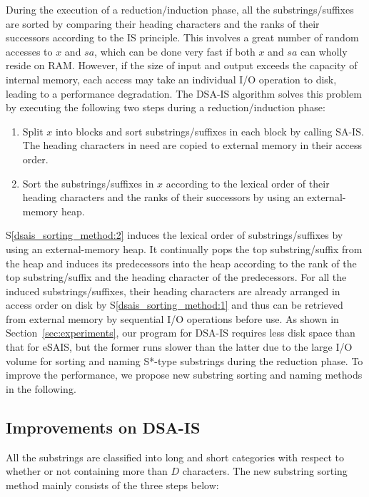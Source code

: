 \documentclass[10pt,journal,compsoc]{IEEEtran}
\begin{document}
During the execution of a reduction/induction phase, all the substrings/suffixes are sorted by comparing their heading characters and the ranks of their successors according to the IS principle. This involves a great number of random accesses to $x$ and $sa$, which can be done very fast if both $x$ and $sa$ can wholly reside on RAM. However, if the size of input and output exceeds the capacity of internal memory, each access may take an individual I/O operation to disk, leading to a performance degradation. The DSA-IS algorithm solves this problem by executing the following two steps during a reduction/induction phase:

\begin{enumerate}[S1]
	
	\item Split $x$ into blocks and sort substrings/suffixes in each block by calling SA-IS. The heading characters in need are copied to external memory in their access order. \label{dsais_sorting_method:1}
	
	\item Sort the substrings/suffixes in $x$ according to the lexical order of their heading characters and the ranks of their successors by using an external-memory heap. \label{dsais_sorting_method:2}
\end{enumerate}

S\ref{dsais_sorting_method:2} induces the lexical order of substrings/suffixes by using an external-memory heap. It continually pops the top substring/suffix from the heap and induces its predecessors into the heap according to the rank of the top substring/suffix and the heading character of the predecessors. For all the induced substrings/suffixes, their heading characters are already arranged in access order on disk by S\ref{dsais_sorting_method:1} and thus can be retrieved from external memory by sequential I/O operations before use. As shown in Section~\ref{sec:experiments}, our program for DSA-IS requires less disk space than that for eSAIS, but the former runs slower than the latter due to the large I/O volume for sorting and naming S*-type substrings during the reduction phase. To improve the performance, we propose new substring sorting and naming methods in the following.

\subsection{Improvements on DSA-IS}

All the substrings are classified into long and short categories with respect to whether or not containing more than $D$ characters. The new substring sorting method mainly consists of the three steps below:
\end{document}
